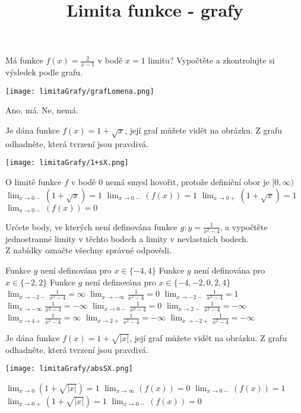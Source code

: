 \documentclass[language = czech,randomorder]{webquiz}
\title{Limita funkce - grafy}
\begin{document}
	\begin{question}
		Má funkce $f(x)=\frac{2}{x-1}$ v bodě $x=1$ limitu? Vypočtěte a zkontrolujte si výsledek podle grafu. 
		\begin{center}
			\texttt{[image: limitaGrafy/grafLomena.png]}
		\end{center}
		\begin{choice}
			\incorrect Ano, má.
			\correct Ne, nemá.
		\end{choice}
	\end{question}

	\begin{question}
		Je dána funkce $f(x)=1+\sqrt{x}$, její graf můžete vidět na obrázku. Z grafu odhadněte, která tvrzení jsou pravdivá.
		\begin{center}
			\texttt{[image: limitaGrafy/1+sX.png]}
		\end{center}
		\begin{choice}[multiple]
			\correct O limitě funkce $f$ v bodě $0$ nemá smysl hovořit, protože definiční obor je $[0,\infty)$
			\incorrect $\lim_{x\to 0-}(1+\sqrt{x})=1$
			\incorrect $\lim_{x\to 0-}(f(x))=1$
			\correct $\lim_{x\to 0+}(1+\sqrt{x})=1$
			\incorrect $\lim_{x\to 0-}(f(x))=0$
		\end{choice}
	\end{question}

	\begin{question}
		Určete body, ve kterých není definována funkce $g: y=\frac{1}{x^2-4}$, a vypočtěte jednostranné limity v těchto bodech a limity v nevlastních bodech.\\Z nabídky označte všechny správné odpovědi.
		\begin{choice}[multiple, columns=2]
			\incorrect Funkce $g$ není definována pro $x\in \{-4,4\}$%
			\correct Funkce $g$ není definována pro $x\in \{-2,2\}$%
			\incorrect Funkce $g$ není definována pro $x\in \{-4,-2,0,2,4\}$%
			\correct $\lim_{x\to -2-}\frac{1}{x^2-4}=\infty$%
			\correct $\lim_{x\to -\infty}\frac{1}{x^2-4}=0$%
			\incorrect $\lim_{x\to -2-}\frac{1}{x^2-4}=1$%
			\incorrect $\lim_{x\to -\infty}\frac{1}{x^2-4}=-\infty$%
			\incorrect $\lim_{x\to 0-}\frac{1}{x^2-4}=0$%
			\correct $\lim_{x\to 2-}\frac{1}{x^2-4}=-\infty$%
			\incorrect $\lim_{x\to 4+}\frac{1}{x^2-4}=\infty$%
			\incorrect $\lim_{x\to 2+}\frac{1}{x^2-4}=-\infty$%
			\correct $\lim_{x\to -2+}\frac{1}{x^2-4}=-\infty$%
		\end{choice}
	\end{question}

	\begin{question}
		Je dána funkce $f(x)=1+\sqrt{|x|}$, její graf můžete vidět na obrázku. Z grafu odhadněte, která tvrzení jsou pravdivá.
		\begin{center}
			\texttt{[image: limitaGrafy/absSX.png]}
		\end{center}
		\begin{choice}[multiple]
			\correct $\lim_{x\to 0}(1+\sqrt{|x|})=1$
			\incorrect $\lim_{x\to \infty}(f(x))=0$
			\correct $\lim_{x\to 0-}(f(x))=1$
			\correct $\lim_{x\to 0+}(1+\sqrt{|x|})=1$
			\incorrect $\lim_{x\to 0-}(f(x))=0$
		\end{choice}
	\end{question}
\end{document}
